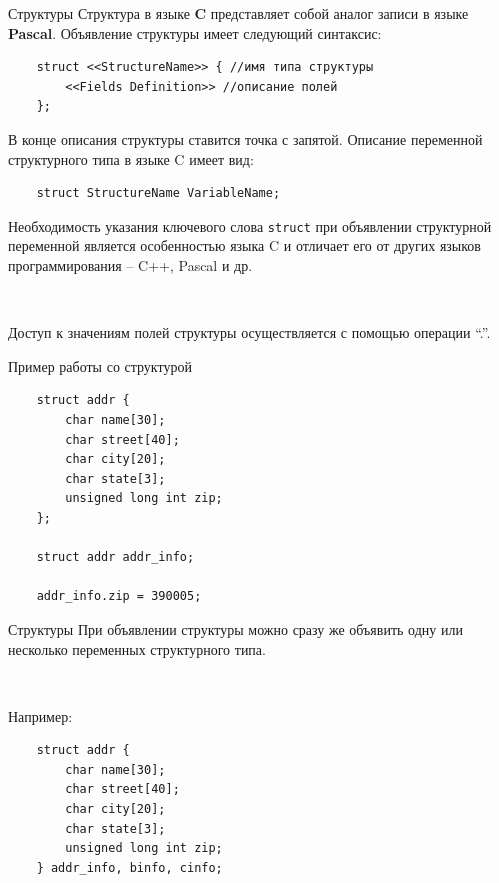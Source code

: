 \documentclass{beamer}
\begin{document}
\begin{frame}[fragile]{Структуры}
    Структура в языке \textbf{C} представляет собой аналог записи в языке \textbf{Pascal}. Объявление структуры имеет следующий синтаксис:
    \begin{verbatim}
    struct <<StructureName>> { //имя типа структуры
        <<Fields Definition>> //описание полей
    };
    \end{verbatim}
    
    В конце описания структуры ставится точка с запятой.
    Описание переменной структурного типа в языке C имеет вид:
    \begin{verbatim}
    struct StructureName VariableName; 
    \end{verbatim}
    
    Необходимость указания ключевого слова \texttt{struct} при объявлении структурной переменной является особенностью языка C и отличает его от других языков программирования – C++, Pascal и др.
    
    ~
    
    Доступ к значениям полей структуры осуществляется с помощью операции “.”.
\end{frame}

\begin{frame}[fragile]{Пример работы со структурой}
    \begin{verbatim}
    struct addr {
        char name[30];
        char street[40];
        char city[20];
        char state[3];
        unsigned long int zip;
    };
    
    struct addr addr_info;
    
    addr_info.zip = 390005;
    \end{verbatim}
\end{frame}

\begin{frame}[fragile]{Структуры}
    При объявлении структуры можно сразу же объявить одну или несколько переменных структурного типа. 
    
    ~
    
    Например:
    \begin{verbatim}
    struct addr {
        char name[30];
        char street[40];
        char city[20];
        char state[3];
        unsigned long int zip;
    } addr_info, binfo, cinfo;
    \end{verbatim}
\end{frame}
\end{document}
